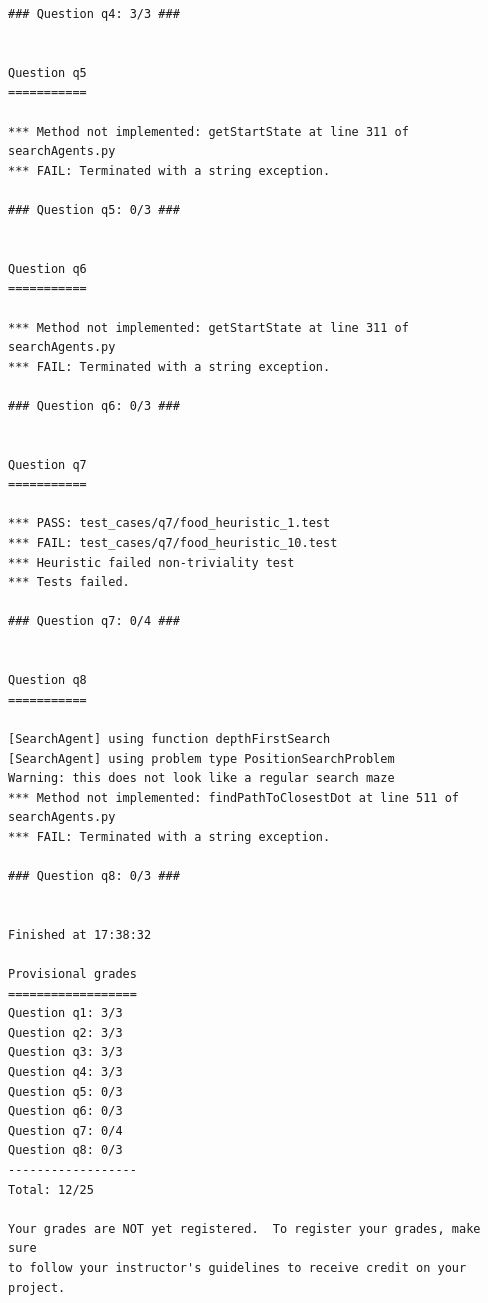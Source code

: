 \documentclass{report}
\begin{document}
\begin{lstlisting}
### Question q4: 3/3 ###


Question q5
===========

*** Method not implemented: getStartState at line 311 of searchAgents.py
*** FAIL: Terminated with a string exception.

### Question q5: 0/3 ###


Question q6
===========

*** Method not implemented: getStartState at line 311 of searchAgents.py
*** FAIL: Terminated with a string exception.

### Question q6: 0/3 ###


Question q7
===========

*** PASS: test_cases/q7/food_heuristic_1.test
*** FAIL: test_cases/q7/food_heuristic_10.test
*** Heuristic failed non-triviality test
*** Tests failed.

### Question q7: 0/4 ###


Question q8
===========

[SearchAgent] using function depthFirstSearch
[SearchAgent] using problem type PositionSearchProblem
Warning: this does not look like a regular search maze
*** Method not implemented: findPathToClosestDot at line 511 of searchAgents.py
*** FAIL: Terminated with a string exception.

### Question q8: 0/3 ###


Finished at 17:38:32

Provisional grades
==================
Question q1: 3/3
Question q2: 3/3
Question q3: 3/3
Question q4: 3/3
Question q5: 0/3
Question q6: 0/3
Question q7: 0/4
Question q8: 0/3
------------------
Total: 12/25

Your grades are NOT yet registered.  To register your grades, make sure
to follow your instructor's guidelines to receive credit on your project.
          \end{lstlisting}
\end{document}
